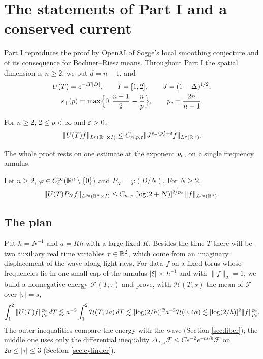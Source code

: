 \section{The statements of Part I and a conserved current}\label{sec:current}

Part I reproduces the proof by OpenAI \cite{OAI26} of Sogge's local smoothing conjecture and
of its consequence for Bochner--Riesz means. Throughout Part I the spatial dimension is
$n\ge2$, we put $d=n-1$, and
\begin{gather*}
U(T)=e^{-iT|D|},\qquad I=[1,2],\qquad J=(1-\Delta)^{1/2},\\
s_+(p)=\max\Bigl\{0,\frac{n-1}{2}-\frac np\Bigr\},\qquad p_{\mathrm c}=\frac{2n}{n-1}.
\end{gather*}

\begin{theorem}\label{thm:ls}
For $n\ge2$, $2\le p<\infty$ and $\varepsilon>0$,
\[
\|U(T)f\|_{L^p(\mathbb{R}^n\times I)}\le C_{n,p,\varepsilon}\|J^{s_+(p)+\varepsilon}f\|_{L^p(\mathbb{R}^n)} .
\]
\end{theorem}

The whole proof rests on one estimate at the exponent $p_{\mathrm c}$, on a single frequency annulus.

\begin{theorem}\label{thm:annular}
Let $n\ge2$, $\varphi\in C^\infty_c(\mathbb{R}^n\setminus\{0\})$ and $P_N=\varphi(D/N)$. For $N\ge2$,
\[
\|U(T)P_Nf\|_{L^{p_{\mathrm c}}(\mathbb{R}^n\times I)}\le C_{n,\varphi}\,[\log(2+N)]^{2/p_{\mathrm c}}\,\|f\|_{L^{p_{\mathrm c}}(\mathbb{R}^n)} .
\]
\end{theorem}

\subsection{The plan}\label{ssec:plan}
Put $h=N^{-1}$ and $a=Kh$ with a large fixed $K$. Besides the time $T$ there will be two
auxiliary real time variables $\tau\in\mathbb{R}^2$, which come from an imaginary displacement of
the wave along light rays. For data $f$ on a fixed torus whose frequencies lie in one small
cap of the annulus $|\xi|\asymp h^{-1}$ and with $\|f\|_2=1$, we build a nonnegative energy
$\mathcal F(T,\tau)$ and prove, with $\mathcal H(T,s)$ the mean of $\mathcal F$ over
$|\tau|=s$,
\[
\int_1^2\|U(T)f\|_{p_{\mathrm c}}^{p_{\mathrm c}}\,dT\lesssim a^{-2}\int_1^2\mathcal H(T,2a)\,dT
\lesssim[\log(2/h)]^2a^{-2}\mathcal H(0,4a)\lesssim[\log(2/h)]^2\|f\|_{p_{\mathrm c}}^{p_{\mathrm c}}.
\]
The outer inequalities compare the energy with the wave (Section \ref{sec:fiber}); the middle
one uses only the differential inequality $\Delta_{T,\tau}\mathcal F\le Cs^{-2}e^{-cs/h}\mathcal F$
on $2a\le|\tau|\le3$ (Section \ref{sec:cylinder}).


